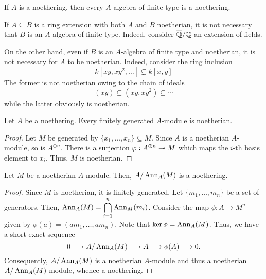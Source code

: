 \begin{corollary}
    If $A$ is a noethering, then every $A$-algebra of finite type is a noethering.
\end{corollary}

If $A\subseteq B$ is a ring extension with both $A$ and $B$ noetherian, it is not necessary that $B$ is an $A$-algebra of finite type. Indeed, consider $\overline{\mathbb{Q}}/\mathbb{Q}$ an extension of fields.

On the other hand, even if $B$ is an $A$-algebra of finite type and noetherian, it is not necessary for $A$ to be noetherian. Indeed, consider the ring inclusion 
\begin{equation*}
    k[xy,xy^2,\ldots]\subsetneq k[x,y]
\end{equation*}
The former is not noetherian owing to the chain of ideals 
\begin{equation*}
    (xy)\subsetneq(xy,xy^2)\subsetneq\cdots
\end{equation*}
while the latter obviously is noetherian.

\begin{proposition}
    Let $A$ be a noethering. Every finitely generated $A$-module is noetherian.
\end{proposition}
\begin{proof}
    Let $M$ be generated by $\{x_1,\dots,x_n\}\subseteq M$. Since $A$ is a noetherian $A$-module, so is $A^{\oplus n}$. There is a surjection $\varphi: A^{\oplus n}\twoheadrightarrow M$ which maps the $i$-th basis element to $x_i$. Thus, $M$ is noetherian.
\end{proof}

\begin{proposition}
    Let $M$ be a noetherian $A$-module. Then, $A/\operatorname{Ann}_A(M)$ is a noethering.
\end{proposition}
\begin{proof}
    Since $M$ is noetherian, it is finitely generated. Let $\{m_1,\ldots,m_n\}$ be a set of generators. Then, $\displaystyle\operatorname{Ann}_A(M) = \bigcap_{i = 1}^n\operatorname{Ann}_M(m_i)$. Consider the map $\phi: A\to M^n$ given by $\phi(a) = (am_1,\ldots,am_n)$. Note that $\ker\phi = \operatorname{Ann}_A(M)$. Thus, we have a short exact sequence 
    \begin{equation*}
        0\longrightarrow A/\operatorname{Ann}_A(M)\longrightarrow A\longrightarrow\phi(A)\longrightarrow 0.
    \end{equation*}
    Consequently, $A/\operatorname{Ann}_A(M)$ is a noetherian $A$-module and thus a noetherian $A/\operatorname{Ann}_A(M)$-module, whence a noethering.
\end{proof}

